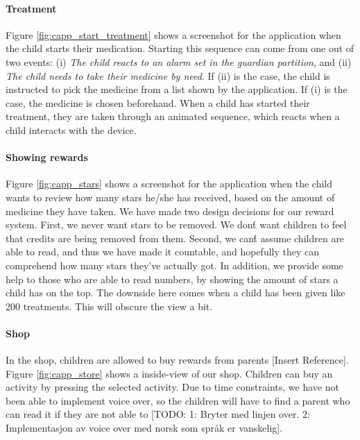 \paragraph{Treatment}
Figure \ref{fig:capp_start_treatment} shows a screenshot for the application when the child starts their medication. Starting this sequence can come from one out of two events: (i) \emph{The child reacts to an alarm set in the guardian partition}, and (ii) \emph{The child needs to take their medicine by need}. If (ii) is the case, the child is instructed to pick the medicine from a list shown by the application. If (i) is the case, the medicine is chosen beforehand. When a child has started their treatment, they are taken through an animated sequence, which reacts when a child interacts with the device.  



\paragraph{Showing rewards}

Figure \ref{fig:capp_stars} shows a screenshot for the application when the child wants to review how many stars he/she has received, based on the amount of medicine they have taken. We have made two design decisions for our reward system. First, we never want stars to be removed. We don\'t want children to feel that credits are being removed from them. Second, we can\'t assume children are able to read, and thus we have made it countable, and hopefully they can comprehend how many stars they've actually got. In addition, we provide some help to those who are able to read numbers, by showing the amount of stars a child has on the top. The downside here comes when a child has been given like 200 treatments. This will obscure the view a bit.     

\paragraph{Shop}
In the shop, children are allowed to buy rewards from parents [Insert Reference]. Figure \ref{fig:capp_store} shows a inside-view of our shop. Children can buy an activity by pressing the selected activity. Due to time constraints, we have not been able to implement voice over, so the children will have to find a parent who can read it if they are not able to [TODO: 1: Bryter med linjen over. 2: Implementasjon av voice over med norsk som språk er vanskelig]. 



